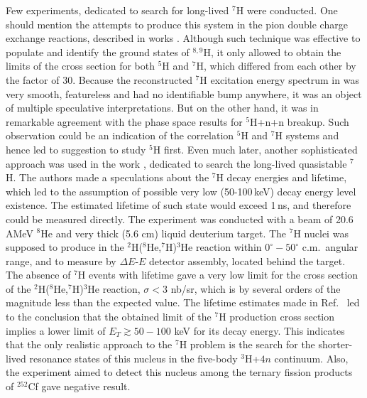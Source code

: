 Few experiments, dedicated to search for long-lived $^{7}$H were conducted.
One should mention the attempts to produce this system in the pion double charge exchange reactions, described in works \cite{Seth:1981,Evseev:1981}.
Although such technique was effective to populate and identify the ground states of $^{8,9}$H, it only allowed to obtain the limits of the cross section for both $^{5}$H and $^{7}$H, which differed from each other by the factor of 30.
Because the reconstructed $^{7}$H excitation energy spectrum in \cite{Seth:1981} was very smooth, featureless and had no identifiable bump anywhere, it was an object of multiple speculative interpretations.
But on the other hand, it was in remarkable agreement with the phase space results for $^{5}$H+n+n breakup.
Such observation could be an indication of the correlation $^{5}$H and $^{7}$H systems and hence led to suggestion to study $^{5}$H first.
Even much later, another sophisticated approach was used in the work \cite{Golovkov:2004}, dedicated to search the long-lived quasistable $^{7}$H.
The authors made a speculations about the $^{7}$H decay energies and lifetime, which led to the assumption of possible very low (50-100\,keV) decay energy level existence.
The estimated lifetime of such state would exceed 1\,ns, and therefore could be measured directly.
The experiment was conducted with a beam of 20.6\,AMeV $^{8}$He and very thick (5.6 cm) liquid deuterium target.
The $^{7}$H nuclei was supposed to produce in the $^2$H($^8$He,$^7$H)$^3$He reaction within $0^{\circ}-50^{\circ}$ c.m.\ angular range, and to measure by $\Delta E$-$E$ detector assembly, located behind the target. 
The absence of $^7$H events with lifetime gave a very low limit for the cross section of the $^2$H($^8$He,$^7$H)$^3$He reaction, $\sigma < 3$ nb/sr, which is by several orders of the magnitude less than the expected value.
The lifetime estimates made in Ref.\ \cite{Golovkov:2004} led to the conclusion that the obtained limit of the $^{7}$H production cross section implies a lower limit of $E_T \gtrsim 50-100$ keV for its decay energy.
This indicates that the only realistic approach to the $^7$H problem is the search for the shorter-lived resonance states of this nucleus in the five-body $^{3}$H+$4n$ continuum.
Also, the experiment \cite{Aleksandrov:1982} aimed to detect this nucleus among the ternary fission products of $^{252}$Cf gave negative result.

